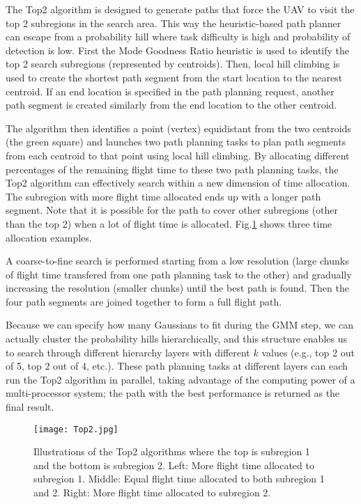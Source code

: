 \documentclass[journal]{IEEEtran}
\begin{document}
The Top2 algorithm is designed to generate paths that force the UAV to visit the top 2 subregions in the search area. This way the heuristic-based path planner can escape from a probability hill where task difficulty is high and probability of detection is low. First the Mode Goodness Ratio heuristic is used to identify the top 2 search subregions (represented by centroids). Then, local hill climbing is used to create the shortest path segment from the start location to the nearest centroid. If an end location is specified in the path planning request, another path segment is created similarly from the end location to the other centroid. 

The algorithm then identifies a point (vertex) equidistant from the two centroids (the green square) and launches two path planning tasks to plan path segments from each centroid to that point using local hill climbing. By allocating different percentages of the remaining flight time to these two path planning tasks, the Top2 algorithm can effectively search within a new dimension of time allocation. The subregion with more flight time allocated ends up with a longer path segment. Note that it is possible for the path to cover other subregions (other than the top 2) when a lot of flight time is allocated. Fig.\ref{Top2} shows three time allocation examples. 

A coarse-to-fine search is performed starting from a low resolution (large chunks of flight time transfered from one path planning task to the other) and gradually increasing the resolution (smaller chunks) until the best path is found. Then the four path segments are joined together to form a full flight path.

Because we can specify how many Gaussians to fit during the GMM step, we can actually cluster the probability hills hierarchically, and this structure enables us to search through different hierarchy layers with different $k$ values (e.g., top 2 out of 5, top 2 out of 4, etc.). These path planning tasks at different layers can each run the Top2 algorithm in parallel, taking advantage of the computing power of a multi-processor system; the path with the best performance is returned as the final result.
\begin{figure}
\centering
\texttt{[image: Top2.jpg]}
\caption{Illustrations of the Top2 algorithms where the top is subregion 1 and the bottom is subregion 2. Left: More flight time allocated to subregion 1. Middle: Equal flight time allocated to both subregion 1 and 2. Right: More flight time allocated to subregion 2.}
\label{Top2}
\end{figure}
\end{document}
